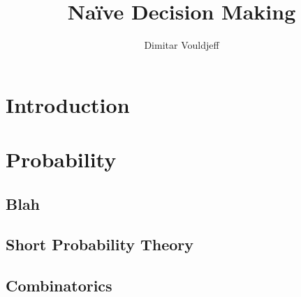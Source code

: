 \documentclass[12pt, a4paper,leqno]{report}
\title{Naïve Decision Making}
\author{Dimitar Vouldjeff}
\begin{document}
\maketitle
\tableofcontents

\chapter{Introduction}


\chapter{Probability}

\section{Blah}


\section{Short Probability Theory}


\section{Combinatorics}

\end{document}
